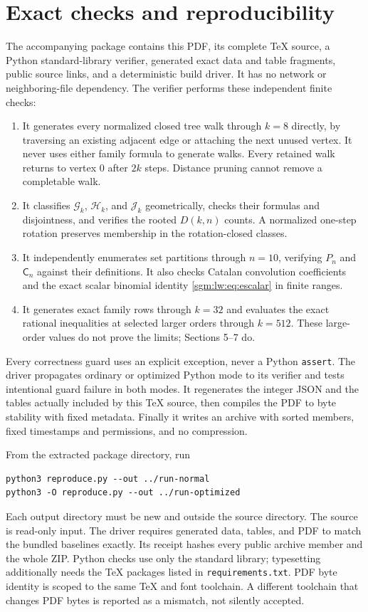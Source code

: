 \documentclass[11pt,letterpaper]{article}
\theoremstyle{remark}\newtheorem{remark}[theorem]{Remark}
\newcommand{\Gc}{\mathcal G}\newcommand{\Hc}{\mathcal H}\newcommand{\Jc}{\mathcal J}
\newcommand{\Cgood}{\mathsf C}\DeclareMathOperator{\norm}{norm}
\theoremstyle{definition}\newtheorem{definition}[theorem]{Definition}
\begin{document}
\section{Exact checks and reproducibility}
The accompanying package contains this PDF, its complete TeX source, a Python standard-library verifier, generated exact data and table fragments, public source links, and a deterministic build driver. It has no network or neighboring-file dependency. The verifier performs these independent finite checks:
\begin{enumerate}
\item It generates every normalized closed tree walk through $k=8$ directly, by traversing an existing adjacent edge or attaching the next unused vertex. It never uses either family formula to generate walks. Every retained walk returns to vertex $0$ after $2k$ steps. Distance pruning cannot remove a completable walk.
\item It classifies $\Gc_k$, $\Hc_k$, and $\Jc_k$ geometrically, checks their formulas and disjointness, and verifies the rooted $D(k,n)$ counts. A normalized one-step rotation preserves membership in the rotation-closed classes.
\item It independently enumerates set partitions through $n=10$, verifying $P_n$ and $\Cgood_n$ against their definitions. It also checks Catalan convolution coefficients and the exact scalar binomial identity \eqref{sgm:lw:eq:escalar} in finite ranges.
\item It generates exact family rows through $k=32$ and evaluates the exact rational inequalities at selected larger orders through $k=512$. These large-order values do not prove the limits; Sections 5--7 do.
\end{enumerate}

Every correctness guard uses an explicit exception, never a Python \texttt{assert}. The driver propagates ordinary or optimized Python mode to its verifier and tests intentional guard failure in both modes. It regenerates the integer JSON and the tables actually included by this TeX source, then compiles the PDF to byte stability with fixed metadata. Finally it writes an archive with sorted members, fixed timestamps and permissions, and no compression.

From the extracted package directory, run
\begin{verbatim}
python3 reproduce.py --out ../run-normal
python3 -O reproduce.py --out ../run-optimized
\end{verbatim}
Each output directory must be new and outside the source directory. The source is read-only input. The driver requires generated data, tables, and PDF to match the bundled baselines exactly. Its receipt hashes every public archive member and the whole ZIP. Python checks use only the standard library; typesetting additionally needs the TeX packages listed in \texttt{requirements.txt}. PDF byte identity is scoped to the same TeX and font toolchain. A different toolchain that changes PDF bytes is reported as a mismatch, not silently accepted.
\end{document}

